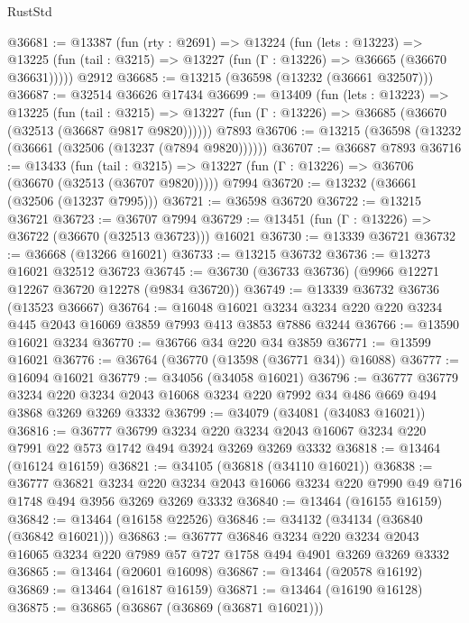 \begin{lexlean}{RustStd}
\begin{coremodule}
@36681 := @13387
    (fun (rty : @2691) =>
    @13224
      (fun (lets : @13223) =>
      @13225 (fun (tail : @3215) => @13227 (fun (Γ : @13226) => @36665 (@36670 @36631)))))
    @2912
@36685 := @13215 (@36598 (@13232 (@36661 @32507)))
@36687 := @32514 @36626 @17434
@36699 := @13409
    (fun (lets : @13223) =>
    @13225
      (fun (tail : @3215) =>
      @13227 (fun (Γ : @13226) => @36685 (@36670 (@32513 (@36687 @9817 @9820))))))
    @7893
@36706 := @13215 (@36598 (@13232 (@36661 (@32506 (@13237 (@7894 @9820))))))
@36707 := @36687 @7893
@36716 := @13433
    (fun (tail : @3215) => @13227 (fun (Γ : @13226) => @36706 (@36670 (@32513 (@36707 @9820)))))
    @7994
@36720 := @13232 (@36661 (@32506 (@13237 @7995)))
@36721 := @36598 @36720
@36722 := @13215 @36721
@36723 := @36707 @7994
@36729 := @13451 (fun (Γ : @13226) => @36722 (@36670 (@32513 @36723))) @16021
@36730 := @13339 @36721
@36732 := @36668 (@13266 @16021)
@36733 := @13215 @36732
@36736 := @13273 @16021 @32512 @36723
@36745 := @36730 (@36733 @36736) (@9966 @12271 @12267 @36720 @12278 (@9834 @36720))
@36749 := @13339 @36732 @36736 (@13523 @36667)
@36764 := @16048
    @16021
    @3234
    @3234
    @220
    @220
    @3234
    @445
    @2043
    @16069
    @3859
    @7993
    @413
    @3853
    @7886
    @3244
@36766 := @13590 @16021 @3234
@36770 := @36766 @34 @220 @34 @3859
@36771 := @13599 @16021
@36776 := @36764 (@36770 (@13598 (@36771 @34)) @16088)
@36777 := @16094 @16021
@36779 := @34056 (@34058 @16021)
@36796 := @36777
    @36779
    @3234
    @220
    @3234
    @2043
    @16068
    @3234
    @220
    @7992
    @34
    @486
    @669
    @494
    @3868
    @3269
    @3269
    @3332
@36799 := @34079 (@34081 (@34083 @16021))
@36816 := @36777
    @36799
    @3234
    @220
    @3234
    @2043
    @16067
    @3234
    @220
    @7991
    @22
    @573
    @1742
    @494
    @3924
    @3269
    @3269
    @3332
@36818 := @13464 (@16124 @16159)
@36821 := @34105 (@36818 (@34110 @16021))
@36838 := @36777
    @36821
    @3234
    @220
    @3234
    @2043
    @16066
    @3234
    @220
    @7990
    @49
    @716
    @1748
    @494
    @3956
    @3269
    @3269
    @3332
@36840 := @13464 (@16155 @16159)
@36842 := @13464 (@16158 @22526)
@36846 := @34132 (@34134 (@36840 (@36842 @16021)))
@36863 := @36777
    @36846
    @3234
    @220
    @3234
    @2043
    @16065
    @3234
    @220
    @7989
    @57
    @727
    @1758
    @494
    @4901
    @3269
    @3269
    @3332
@36865 := @13464 (@20601 @16098)
@36867 := @13464 (@20578 @16192)
@36869 := @13464 (@16187 @16159)
@36871 := @13464 (@16190 @16128)
@36875 := @36865 (@36867 (@36869 (@36871 @16021)))

\end{coremodule}
\end{lexlean}
